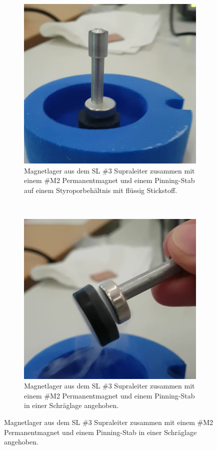\begin{figure}[H]
\centering
	\begin{subfigure}[t]{0.45\textwidth}
    \includegraphics[width=\textwidth]{Auswertung/SL_3.jpg}
    \caption{Magnetlager aus dem SL \#3 Supraleiter zusammen mit einem
    \#M2 Permanentmagnet und einem Pinning-Stab auf einem Styroporbehältnis mit
    flüssig Stickstoff.}
    \label{fig:SL3}
	\end{subfigure}
	~
	\begin{subfigure}[t]{0.45\textwidth}
    \includegraphics[width=\textwidth]{Auswertung/SL_4.jpg}
    \caption{Magnetlager aus dem SL \#3 Supraleiter zusammen mit einem
    \#M2 Permanentmagnet und einem Pinning-Stab in einer Schräglage angehoben.}
    \label{fig:SL4}
	\end{subfigure}
\end{figure}

